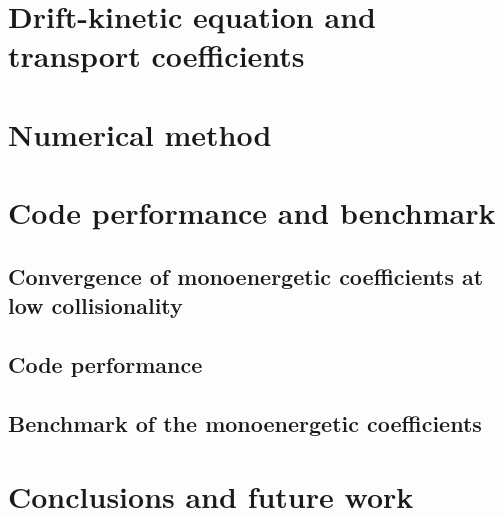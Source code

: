 \documentclass[10pt]{iopart}
\begin{document}
\section{Drift-kinetic equation and transport coefficients}
\label{sec:DKE}


\section{Numerical method}
\label{sec:Algorithm}

%
\section{Code performance and benchmark}
\label{sec:Results_Benchmark}





\subsection{Convergence of monoenergetic coefficients at low collisionality}
\label{subsec:Convergence}


\subsection{Code performance}\label{subsec:Performance}

\FloatBarrier

\subsection{Benchmark of the monoenergetic coefficients}\label{subsec:Benchmark}



\section{Conclusions and future work}
\label{sec:Conclusions}

 
\end{document}
